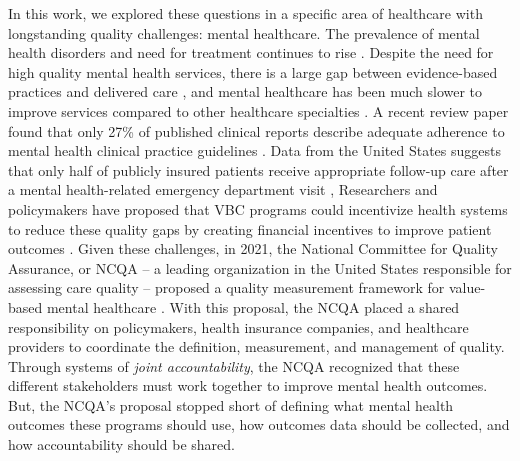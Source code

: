 In this work, we explored these questions in a specific area of healthcare with longstanding quality challenges: mental healthcare.
The prevalence of mental health disorders and need for treatment continues to rise \cite{wolf_scoping_2024, santomauro_global_2021, xue_mental_2024, mcbain_mental_2023}.
Despite the need for high quality mental health services, there is a large gap between evidence-based practices and delivered care \cite{institute_of_medicine_improving_2006}, and mental healthcare has been much slower to improve services compared to other healthcare specialties \cite{pincus_quality_2016}.
A recent review paper found that only 27\% of published clinical reports describe adequate adherence to mental health clinical practice guidelines \cite{bauer_review_2002}.
Data from the United States suggests that only half of publicly insured patients receive appropriate follow-up care after a mental health-related emergency department visit \cite{the_national_committee_for_quality_assurance_follow-up_2022}, 
Researchers and policymakers have proposed that VBC programs could incentivize health systems to reduce these quality gaps by creating financial incentives to improve patient outcomes \cite{hobbs_knutson_driving_2021}.
Given these challenges, in 2021, the National Committee for Quality Assurance, or NCQA -- a leading organization in the United States responsible for assessing care quality -- proposed a quality measurement framework for value-based mental healthcare \cite{niles_behavioral_2021}.
With this proposal, the NCQA placed a shared responsibility on policymakers, health insurance companies, and healthcare providers to coordinate the definition, measurement, and management of quality.
Through systems of \textit{joint accountability}, the NCQA recognized that these different stakeholders must work together to improve mental health outcomes.
But, the NCQA's proposal stopped short of defining what mental health outcomes these programs should use, how outcomes data should be collected, and how accountability should be shared.

